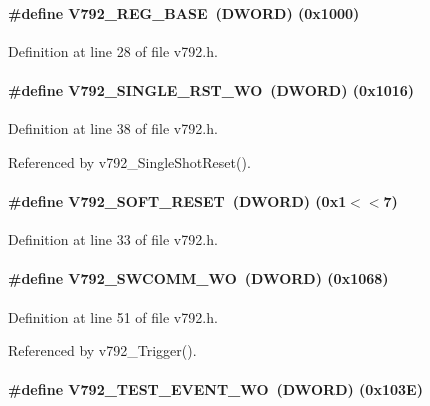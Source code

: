\paragraph[{V792\_\-REG\_\-BASE}]{\setlength{\rightskip}{0pt plus 5cm}\#define V792\_\-REG\_\-BASE~({\bf DWORD}) (0x1000)}\hfill\label{v792_8h_abf70d3e1ea358a82c3a784f381c317f0}


Definition at line 28 of file v792.h.
\paragraph[{V792\_\-SINGLE\_\-RST\_\-WO}]{\setlength{\rightskip}{0pt plus 5cm}\#define V792\_\-SINGLE\_\-RST\_\-WO~({\bf DWORD}) (0x1016)}\hfill\label{v792_8h_a03232f3e8b57bdad3101a46aebe28f18}


Definition at line 38 of file v792.h.

Referenced by v792\_\-SingleShotReset().
\paragraph[{V792\_\-SOFT\_\-RESET}]{\setlength{\rightskip}{0pt plus 5cm}\#define V792\_\-SOFT\_\-RESET~({\bf DWORD}) (0x1$<$$<$7)}\hfill\label{v792_8h_a446ba76df491ad78ffa023ff6eb8f9ba}


Definition at line 33 of file v792.h.
\paragraph[{V792\_\-SWCOMM\_\-WO}]{\setlength{\rightskip}{0pt plus 5cm}\#define V792\_\-SWCOMM\_\-WO~({\bf DWORD}) (0x1068)}\hfill\label{v792_8h_a312f5c5845e5200fc38f30a1521f3121}


Definition at line 51 of file v792.h.

Referenced by v792\_\-Trigger().
\paragraph[{V792\_\-TEST\_\-EVENT\_\-WO}]{\setlength{\rightskip}{0pt plus 5cm}\#define V792\_\-TEST\_\-EVENT\_\-WO~({\bf DWORD}) (0x103E)}\hfill\label{v792_8h_acf425d5d0aa44c25b626f986b0147429}


